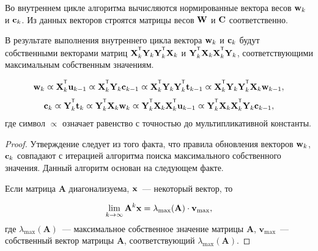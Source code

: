 Во внутреннем цикле алгоритма вычисляются нормированные вектора весов $\mathbf{w}_k$ и $\mathbf{c}_k$. Из данных векторов строятся матрицы весов $\mathbf{W}$ и $\mathbf{C}$ соответственно.

\begin{statement}
	В результате выполнения внутреннего цикла вектора $\mathbf{w}_k$ и $\mathbf{c}_k$ будут собственными векторами матриц $\bX_k^{\T} \bY_k \bY_k^{\T} \bX_k$ и $\bY_k^{\T} \bX_k \bX_k^{\T} \bY_k$, соответствующими максимальным собственным значениям.
	
	\begin{equation*}
	\bw_k \varpropto \bX_k^{\T} \bu_{k-1} \varpropto \bX_k^{\T} \bY_k \bc_{k-1} \varpropto \bX_k^{\T} \bY_k \bY_k^{\T} \bt_{k-1} \varpropto \bX_k^{\T} \bY_k \bY_k^{\T} \bX_k \bw_{k-1},
	\end{equation*}
	\begin{equation*}
	\bc_k \varpropto \bY_k^{\T} \bt_k \varpropto \bY_k^{\T} \bX_k \bw_k \varpropto \bY_k^{\T} \bX_k \bX_k^{\T} \bu_{k-1} \varpropto \bY_k^{\T} \bX_k \bX_k^{\T} \bY_k \bc_{k-1},
	\end{equation*}
	где символ $\varpropto$ означает равенство с точностью до мультипликативной константы. 
	\label{st:eig}
\end{statement}
\begin{proof}
Утверждение следует из того факта, что правила обновления векторов $\mathbf{w}_k$, $\mathbf{c}_k$ совпадают с итерацией алгоритма поиска максимального собственного значения. Данный алгоритм основан на следующем факте.

Если матрица $\mathbf{A}$ диагонализуема, $\mathbf{x}$~--- некоторый вектор, то

\[
\lim_{k \rightarrow \infty} \mathbf{A}^k \mathbf{x} = \lambda_{\max}(\mathbf{A}) \cdot \mathbf{v}_{\max},
\]
где $ \lambda_{\max} (\mathbf{A})$~--- максимальное собственное значение матрицы $\mathbf{A}$, $\mathbf{v}_{\max}$~---собственный вектор матрицы $\mathbf{A}$, соответствующий $ \lambda_{\max} (\mathbf{A})$.

\end{proof}

